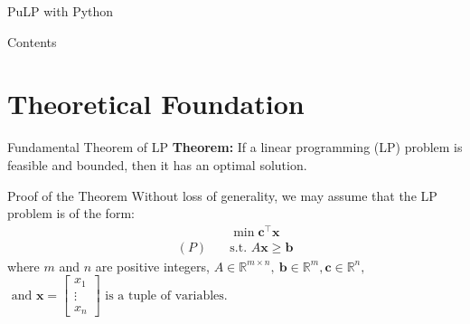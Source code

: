 \documentclass{purdue-slide}
\author{Stan Ioan-Victor, Ioan-Gabriel Spatariu, Ana Sabina Tatar, Mihnea-Gabriel Vasile, Tepfenhart Bertold }
\begin{document}
\begin{titleframe}{PuLP with Python}
	\subtitle{Solving MILP problems using the GLPK solver.}
	\maketitle
\end{titleframe}

\begin{frame}{Contents}
	\tableofcontents
\end{frame}

\section{Theoretical Foundation}

\begin{frame}{Fundamental Theorem of LP}
	\textbf{Theorem:} If a linear programming (LP) problem is feasible and bounded, then it has an optimal solution.
\end{frame}

\begin{frame}{Proof of the Theorem}
	Without loss of generality, we may assume that the LP problem is of the form:
	\[
		\begin{aligned}
			& \min \mathbf{c}^\top \mathbf{x} \\
			(P) \quad & \text{s.t. } A\mathbf{x} \geq \mathbf{b}
		\end{aligned}
	\]
	where $m$ and $n$ are positive integers,  $A \in \mathbb{R}^{m \times n}, \ \mathbf{b} \in \mathbb{R}^m, \mathbf{c} \in \mathbb{R}^n,$ $ \text{ and }
	\mathbf{x} =
	\begin{bmatrix}
		x_1 \\
		\vdots \\
		x_n
	\end{bmatrix} \text{ is a tuple of variables. }$

\end{frame}
\end{document}

